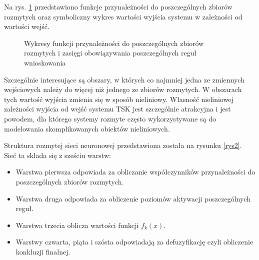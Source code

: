 \documentclass[a4paper,12pt,titlepage]{article}
\begin{document}
Na rys. \ref{rys1} przedstawiono funkcje przynależności do poszczególnych zbiorów rozmytych oraz symboliczny wykres wartości wyjścia systemu w zależności od wartości wejść.
\begin{figure}[h]
\caption{Wykresy funkcji przynależności do poszczególnych zbiorów rozmytych i zasięgi obowiązywania poszczególnych reguł wnioskowania}
\label{rys1}
\end{figure}

Szczególnie interesujące są obszary, w których co najmniej jedna ze zmiennych wejściowych należy do więcej niż jednego ze zbiorów rozmytych. W obszarach tych wartość wyjścia zmienia się w sposób nieliniowy. Własność nieliniowej zależności wyjścia od wejść systemu TSK jest szczególnie atrakcyjna i jest powodem, dla którego systemy rozmyte często wykorzystywane są do modelowania skomplikowanych obiektów nieliniowych.

\pagebreak
Struktura rozmytej sieci neuronowej przedstawiona została na rysunku \ref{rys2}. Sieć ta składa się z sześciu warstw:
\begin{itemize}
\item Warstwa pierwsza odpowiada za obliczanie współczynników przynależności do poszczególnych zbiorów rozmytych.
\item Warstwa druga odpowiada za obliczenie poziomów aktywacji poszczególnych reguł.
\item Warstwa trzecia oblicza wartości funkcji $f_k(x)$.
\item Warstwy czwarta, piąta i szósta odpowiadają za defuzyfikację czyli obliczenie konkluzji finalnej.
\end{itemize}
\end{document}
